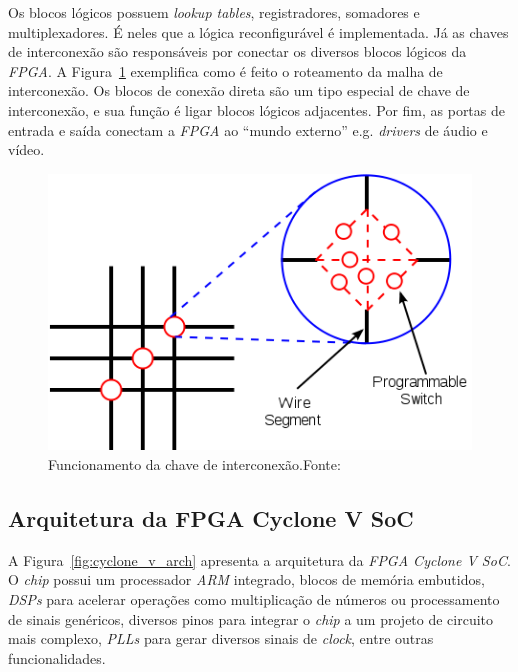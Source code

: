     { Os blocos lógicos possuem \textit{lookup tables}, registradores, somadores
        e multiplexadores. É neles que a lógica reconfigurável é implementada.
        Já as chaves de interconexão são responsáveis por conectar os diversos
        blocos lógicos da \textit{FPGA}. A Figura~\ref{fig:fpga_switch_box} exemplifica
        como é feito o roteamento da malha de interconexão. Os blocos de conexão
        direta são um tipo especial de chave de interconexão, e sua função é ligar
        blocos lógicos adjacentes. Por fim, as portas de entrada e saída conectam
        a \textit{FPGA} ao ``mundo externo'' e.g. \textit{drivers} de áudio e vídeo.
    }

    \begin{figure}[H]
    \centering
    \includegraphics[width=.5\linewidth]
        {../images/switch_box_wikimedia.png}
        \caption[Funcionamento da chave de interconexão]
            {Funcionamento da chave de interconexão.\quad Fonte:~\cite{fpga_switch_box}}
        \label{fig:fpga_switch_box}
    \end{figure}


    \subsection{Arquitetura da FPGA Cyclone V SoC}
    { A Figura~\ref{fig:cyclone_v_arch} apresenta a arquitetura da
        \textit{FPGA Cyclone V SoC}. O \textit{chip} possui um processador
        \textit{ARM} integrado, blocos de memória embutidos, \textit{DSPs} para
        acelerar operações como multiplicação de números ou processamento de
        sinais genéricos, diversos pinos para integrar o \textit{chip} a
        um projeto de circuito mais complexo, \textit{PLLs} para gerar diversos
        sinais de \textit{clock}, entre outras funcionalidades.
    }

